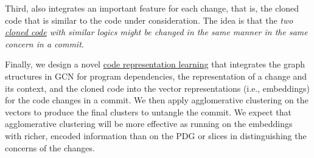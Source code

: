 Third, {\tool} also integrates an important feature for
each change, that is, the cloned code that is similar to the code
under consideration. The idea is that the {\em two \underline{cloned code} with
  similar logics might be changed in the same manner in the same
  concern in a commit}.

Finally, we design a novel \underline{code representation learning}
that integrates the graph structures in GCN for program dependencies,
the representation of a change and its context, and the cloned code
into the vector representations (i.e., embeddings) for the code
changes in a commit. We then apply agglomerative clustering on the
vectors to produce the final clusters to untangle the commit. We
expect that agglomerative clustering will be more effective as running
on the embeddings with richer, encoded information than on the PDG or
slices in distinguishing the concerns of the changes.



